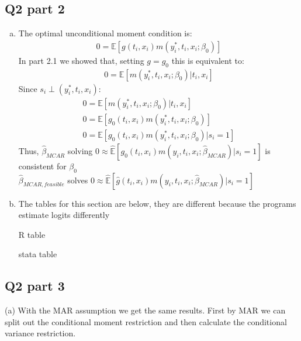 \documentclass[11pt]{article}
\begin{document}
\subsection{Q2 part 2}
\begin{enumerate}[(a)]
	\item The optimal unconditional moment condition is:
	\begin{align*}
	0 = \mathbb{E}[g(t_i, x_i)m(y_i^*, t_i, x_i; \beta_0)]
	\end{align*}
	In part 2.1 we showed that, setting $g=g_0$ this is equivalent to:
	\begin{align*}
	0 = \mathbb{E}[m(y_i^*, t_i, x_i; \beta_0)|t_i,x_i]
	\end{align*}
	Since $s_i  \perp (y_i^*,t_i,x_i)$:
	\begin{align*}
	0 = \mathbb{E}[m(y_i^*, t_i, x_i; \beta_0)|t_i,x_i]\\
	0 = \mathbb{E}[g_0(t_i, x_i)m(y_i^*, t_i, x_i; \beta_0)]\\
	0 = \mathbb{E}[g_0(t_i, x_i)m(y_i^*, t_i, x_i; \beta_0) | s_i=1]
	\end{align*}
	Thus, $\hat{\beta}_{MCAR}$ solving $0 \approx \hat{\mathbb{E}}[g_0(t_i,x_i)m(y_i, t_i, x_i; \hat{\beta}_{MCAR})|s_i=1]$ is consistent for $\beta_0$\\
	$\hat{\beta}_{MCAR,feasible}$ solves $0 \approx \hat{\mathbb{E}}[\hat{g}(t_i,x_i)m(y_i, t_i, x_i; \hat{\beta}_{MCAR})|s_i=1]$
	
	\item The tables for this section are below, they are different because the programs estimate logits differently  \\
	
	\centerline{R table }
	\begin{center}
		
	\end{center}

	\centerline{stata table }
\begin{center}
	
\end{center}


\end{enumerate}

\subsection{Q2 part 3}
(a) With the MAR assumption we get the same results. First by MAR we can split out the conditional moment restriction and then calculate the conditional variance restriction.
\end{document}
